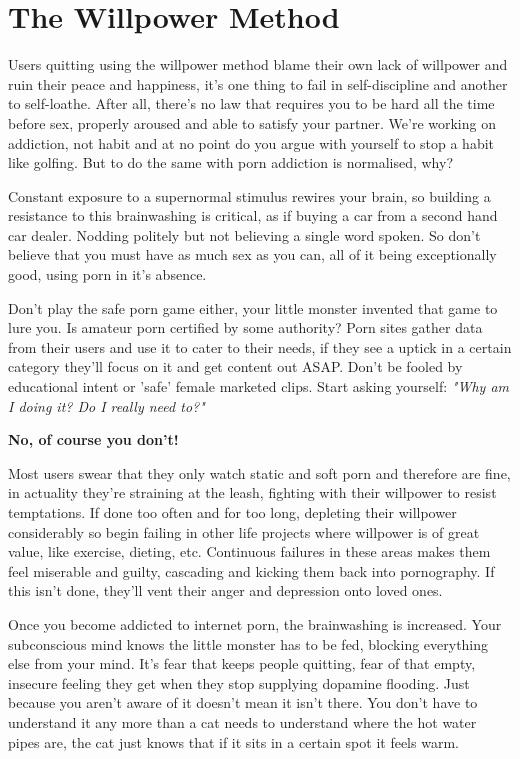 \documentclass[easypeasy.tex]{subfiles}
\begin{document}
\section{The Willpower Method}
Users quitting using the willpower method blame their own lack of willpower and ruin their peace and happiness, it's one thing to fail in self-discipline and another to self-loathe. After all, there's no law that requires you to be hard all the time before sex, properly aroused and able to satisfy your partner. We're working on addiction, not habit and at no point do you argue with yourself to stop a habit like golfing. But to do the same with porn addiction is normalised, why?

Constant exposure to a supernormal stimulus rewires your brain, so building a resistance to this brainwashing is critical, as if buying a car from a second hand car dealer. Nodding politely but not believing a single word spoken. So don't believe that you must have as much sex as you can, all of it being exceptionally good, using porn in it's absence.

Don't play the safe porn game either, your little monster invented that game to lure you. Is amateur porn certified by some authority? Porn sites gather data from their users and use it to cater to their needs, if they see a uptick in a certain category they'll focus on it and get content out ASAP. Don't be fooled by educational intent or 'safe' female marketed clips. Start asking yourself: \textit{"Why am I doing it? Do I really need to?"}

\textbf{No, of course you don't!}

Most users swear that they only watch static and soft porn and therefore are fine, in actuality they're straining at the leash, fighting with their willpower to resist temptations. If done too often and for too long, depleting their willpower considerably so begin failing in other life projects where willpower is of great value, like exercise, dieting, etc. Continuous failures in these areas makes them feel miserable and guilty, cascading and kicking them back into pornography. If this isn't done, they'll vent their anger and depression onto loved ones.

Once you become addicted to internet porn, the brainwashing is increased. Your subconscious mind knows the little monster has to be fed, blocking everything else from your mind. It's fear that keeps people quitting, fear of that empty, insecure feeling they get when they stop supplying dopamine flooding. Just because you aren't aware of it doesn't mean it isn't there. You don't have to understand it any more than a cat needs to understand where the hot water pipes are, the cat just knows that if it sits in a certain spot it feels warm.
\end{document}
